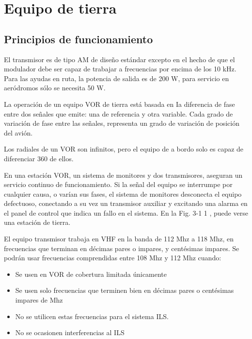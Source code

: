 \section*{Equipo de tierra}

\subsection*{Principios de funcionamiento }

El transmisor es de tipo AM de diseño estándar excepto en el hecho de que el modulador debe ser capaz de trabajar a  frecuencias por encima de los 10 kHz. Para las ayudas en ruta, la potencia de salida es de 200 W, para servicio en aeródromos sólo se necesita 50 W.

La operación de un equipo VOR de tierra está basada en Ia diferencia de fase entre dos señales que emite: una de referencia y otra variable. Cada grado de variación de fase entre las señales, representa un grado de variación de posición del avión.

Los radiales de un VOR son infinitos, pero el equipo de a bordo solo es capaz de diferenciar 360 de ellos.

En una estación VOR, un sistema de monitores y dos transmisores, aseguran un servicio continuo de funcionamiento. Si la señal del equipo se interrumpe por cualquier causa, o varían sus fases, el sistema de monitores desconecta el equipo defectuoso, conectando a su vez un transmisor auxiliar y excitando una alarma en el panel de control que indica un fallo en el sistema. En la Fig. 3-1 1 , puede verse una estación de tierra. 

El equipo transmisor trabaja en VHF en la banda de 112 Mhz a 118 Mhz, en frecuencias que terminan en décimas pares o impares, y centésimas impares. Se podrán usar frecuencias comprendidas entre 108 Mhz y 112 Mhz cuando:

\begin{itemize}
\item Se usen en VOR de cobertura limitada únicamente

\item Se usen solo frecuencias que terminen bien en décimas pares o centésimas impares de Mhz

\item No se utilicen estas frecuencias para el sistema ILS.

\item No se ocasionen interferencias al ILS
\end{itemize}


